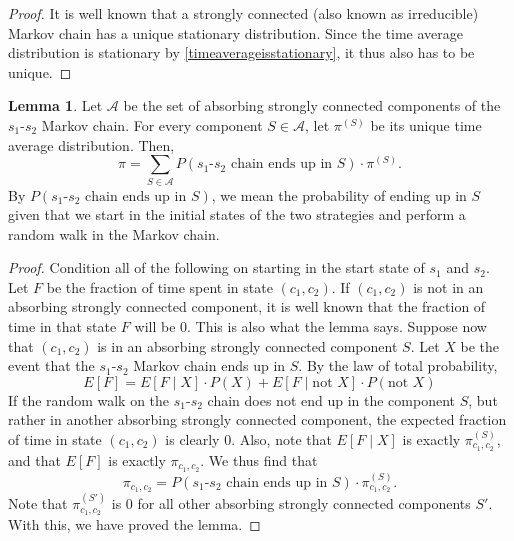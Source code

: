\documentclass[11pt]{amsart}
\theoremstyle{definition}
\newtheorem{lemma}[theorem]{Lemma}
\theoremstyle{remark}
\begin{document}
\begin{proof}
  It is well known that a strongly connected (also known as irreducible) Markov chain has a unique stationary distribution. Since the time average distribution is stationary by \cref{timeaverageisstationary}, it thus also has to be unique.
\end{proof}

\begin{lemma}
  \label{timeaveragedistributiondecomposition}
  Let $\mathcal{A}$ be the set of absorbing strongly connected components of the $s_1$-$s_2$ Markov chain. For every component $S \in \mathcal{A}$, let $\pi^{(S)}$ be its unique time average distribution. Then,
  \begin{equation*}
    \pi = \sum_{S \in \mathcal{A}} P(\text{$s_1$-$s_2$ chain ends up in $S$}) \cdot \pi^{(S)}.
  \end{equation*}
  By $P(s_1\text{-}s_2 \text{ chain ends up in } S)$, we mean the probability of ending up in $S$ given that we start in the initial states of the two strategies and perform a random walk in the Markov chain.
\end{lemma}

\begin{proof}
  Condition all of the following on starting in the start state of $s_1$ and $s_2$. Let $F$ be the fraction of time spent in state $(c_1,c_2)$. If $(c_1,c_2)$ is not in an absorbing strongly connected component, it is well known that the fraction of time in that state $F$ will be 0. This is also what the lemma says. Suppose now that $(c_1,c_2)$ is in an absorbing strongly connected component $S$.
  Let $X$ be the event that the $s_1$-$s_2$ Markov chain ends up in $S$. By the law of total probability, \begin{equation*}
    E[F] = E[F \mid X] \cdot P(X) + E[F \mid \text{not } X] \cdot P(\text{not } X)
  \end{equation*}
   If the random walk on the $s_1$-$s_2$ chain does not end up in the component $S$, but rather in another absorbing strongly connected component, the expected fraction of time in state $(c_1,c_2)$ is clearly 0. Also, note that $E[F \mid X]$ is exactly $\pi^{(S)}_{c_1,c_2}$, and that $E[F]$ is exactly $\pi_{c_1,c_2}$. We thus find that \begin{equation*}
     \pi_{c_1,c_2} = P(\text{$s_1$-$s_2$ chain ends up in $S$}) \cdot \pi^{(S)}_{c_1,c_2}.
   \end{equation*}
   Note that $\pi^{(S')}_{c_1,c_2}$ is 0 for all other absorbing strongly connected components $S'$. With this, we have proved the lemma.
\end{proof}
\end{document}
